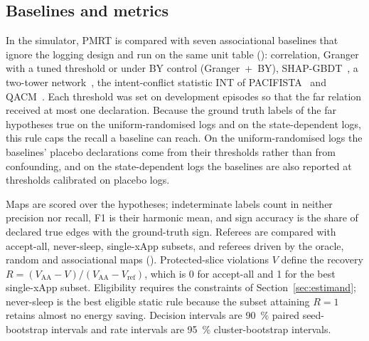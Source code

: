 \subsection{Baselines and metrics}
\label{sec:baselines_scores}

In the simulator, PMRT is compared with seven associational baselines that ignore the logging design and run on the
same unit table (): correlation, Granger~\cite{granger1969causal} with a tuned threshold or under BY control
(Granger~+~BY), SHAP-GBDT~\cite{Sharma_2025}, a two-tower network~\cite{santos2026conflictairan}, the intent-conflict
statistic INT of PACIFISTA~\cite{PACIFISTA} and QACM~\cite{QACM2024}. Each threshold was set on development episodes so
that the far relation received at most one declaration. Because the ground truth labels  of the
 far hypotheses true on the uniform-randomised logs and  on the state-dependent logs, this rule
caps the recall a baseline can reach. On the uniform-randomised logs the baselines' placebo declarations come from their
thresholds rather than from confounding, and on the state-dependent logs the baselines are also reported at thresholds
calibrated on placebo logs.

Maps are scored over the  hypotheses; indeterminate labels count in neither precision nor
recall, F1 is their harmonic mean, and sign accuracy is the share of declared true edges with the ground-truth sign.
Referees are compared with accept-all, never-sleep, single-xApp subsets, and referees driven by the oracle, random and
associational maps (). Protected-slice violations $V$ define the recovery
$R = (V_{\mathrm{AA}} - V)/(V_{\mathrm{AA}} - V_{\mathrm{ref}})$, which is 0 for accept-all and 1 for the best
single-xApp subset. Eligibility requires the constraints of Section~\ref{sec:estimand}; never-sleep is the best
eligible static rule because the subset attaining $R = 1$ retains almost no energy saving. Decision intervals are
90~\% paired seed-bootstrap intervals and rate intervals are 95~\% cluster-bootstrap intervals.
